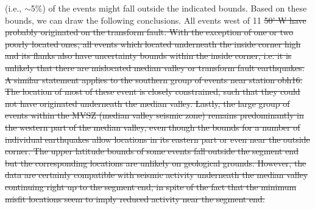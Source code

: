 \documentclass[jgrga]{agu2001} %
\newlength{\tw}
\providecommand{\DIFdel}[1]{{\protect\color{red}\sout{#1}}}                      %
\begin{document}
\begin{article}
{(i.e., $\sim$5\%) of the events might fall outside the indicated
bounds.  Based on these bounds, we can draw the following conclusions.
All events west of 11}%
\DIFdel{50' W  have probably originated on the transform
fault.  With the exception of one or two poorly located ones, all
events which located underneath the inside corner high and its flanks
also have uncertainty bounds within the inside corner, i.e. it is unlikely
that there are mislocated median valley or transform fault
earthquakes.  A similar statement applies to the southern group of
events near station obh16.  The location of most of these event is
closely constrained, such that they could not have originated underneath
the median valley.   Lastly, the large group of events within the MVSZ
(median valley seismic zone) remains predominantly in the western part of the median
valley, even though the bounds for a number of individual earthquakes
allow locations in its eastern part or even near the outside corner.
The upper latitude bounds of
some events fall outside the segment end but the corresponding locations are
unlikely on geological grounds.  However, the data are certainly
compatible with seismic activity underneath the
median valley continuing right up to the segment end, in spite of the
fact that the minimum misfit locations seem to imply reduced activity
near the segment end. 
}%


\end{article}
\end{document}
